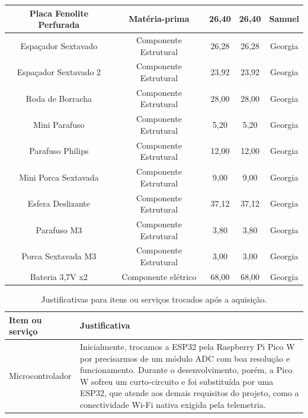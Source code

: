 \begin{table}[htpb]
\begin{center}
\begin{tabular}{|c|c|c|c|c|}
Placa Fenolite Perfurada & Matéria-prima & 26,40   & 26,40 & Samuel                     \\ \hline
Espaçador Sextavado & Componente Estrutural & 26,28 & 26,28 & Georgia                     \\ \hline
Espaçador Sextavado 2& Componente Estrutural & 23,92 & 23,92 & Georgia                     \\ \hline
Roda de Borracha & Componente Estrutural & 28,00   & 28,00 & Georgia                     \\ \hline
Mini Parafuso & Componente Estrutural & 5,20   & 5,20 & Georgia                     \\ \hline
Parafuso Philips & Componente Estrutural & 12,00   & 12,00 & Georgia                     \\ \hline
Mini Porca Sextavada & Componente Estrutural & 9,00   & 9,00 & Georgia                     \\ \hline
Esfera Deslizante & Componente Estrutural & 37,12   & 37,12 & Georgia                     \\ \hline
Parafuso M3 & Componente Estrutural & 3,80   & 3,80 & Georgia                     \\ \hline
Porca Sextavada M3 & Componente Estrutural & 3,00   & 3,00 & Georgia                     \\ \hline
Bateria 3,7V x2 & Componente elétrico & 68,00 & 68,00 &     Georgia                     \\ \hline
\end{tabular}
\end{center}
\end{table}

\begin{table}[h]
\centering
\begin{tabularx}{\textwidth}{|l|X|} 
    \hline
    \textbf{Item ou serviço} & \textbf{Justificativa} \\ \hline
   Microcontrolador & Inicialmente, trocamos a ESP32 pela Raspberry Pi Pico W por precisarmos
     de um módulo ADC com boa resolução e funcionamento. Durante o desenvolvimento, porém,
     a Pico W sofreu um curto-circuito e foi substituída por uma ESP32, que atende aos
     demais requisitos do projeto, como a conectividade Wi-Fi nativa exigida pela telemetria. \\ \hline
\end{tabularx}
\caption{Justificativas para itens ou serviços trocados após a aquisição.}
\end{table}
